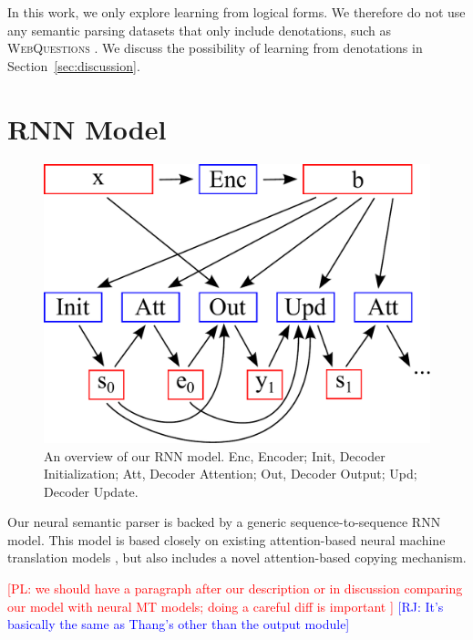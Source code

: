 \documentclass[11pt,letterpaper]{article}
\newcommand\pl[1]{\textcolor{red}{[PL: #1]}}
\newcommand\rj[1]{\textcolor{blue}{[RJ: #1]}}
\begin{document}
In this work, we only explore learning from logical forms.
We therefore do not use any semantic parsing datasets
that only include denotations,
such as \textsc{WebQuestions} \cite{berant2013freebase}.
We discuss the possibility of learning from denotations
in Section~\ref{sec:discussion}.


\section{RNN Model}
\begin{figure}[t] 
\small
\begin{center} 
  \includegraphics[scale=0.4]{fig-rnn.pdf}
\end{center} 
\caption{An overview of our RNN model.  
  Enc, Encoder; Init, Decoder Initialization;
  Att, Decoder Attention; Out, Decoder Output;
  Upd; Decoder Update.
}
\label{fig:rnn}
\end{figure}
Our neural semantic parser is backed by a generic sequence-to-sequence RNN model.
This model is based closely on existing 
attention-based neural machine translation models
\cite{luong2015translation},
but also includes a novel attention-based copying mechanism.

\pl{we should have a paragraph after our description
  or in discussion comparing our model with neural MT models;
  doing a careful diff is important }
  \rj{It's basically the same as Thang's other than the output module}
\end{document}
